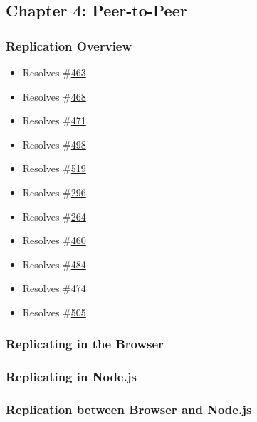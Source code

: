 \subsection{Chapter 4: Peer-to-Peer}\label{chapter-4-peer-to-peer}

\subsubsection{Replication Overview}\label{replication-overview-1}

\begin{itemize}
\tightlist
\item
  Resolves \#\href{https://github.com/orbitdb/orbit-db/issues/463}{463}
\item
  Resolves \#\href{https://github.com/orbitdb/orbit-db/issues/468}{468}
\item
  Resolves \#\href{https://github.com/orbitdb/orbit-db/issues/471}{471}
\item
  Resolves \#\href{https://github.com/orbitdb/orbit-db/issues/498}{498}
\item
  Resolves \#\href{https://github.com/orbitdb/orbit-db/issues/519}{519}
\item
  Resolves \#\href{https://github.com/orbitdb/orbit-db/issues/296}{296}
\item
  Resolves \#\href{https://github.com/orbitdb/orbit-db/issues/264}{264}
\item
  Resolves \#\href{https://github.com/orbitdb/orbit-db/issues/460}{460}
\item
  Resolves \#\href{https://github.com/orbitdb/orbit-db/issues/484}{484}
\item
  Resolves \#\href{https://github.com/orbitdb/orbit-db/issues/474}{474}
\item
  Resolves \#\href{https://github.com/orbitdb/orbit-db/issues/505}{505}
\end{itemize}

\subsubsection{Replicating in the
Browser}\label{replicating-in-the-browser-1}

\subsubsection{Replicating in Node.js}\label{replicating-in-node.js-1}

\subsubsection{Replication between Browser and
Node.js}\label{replication-between-browser-and-node.js-1}

